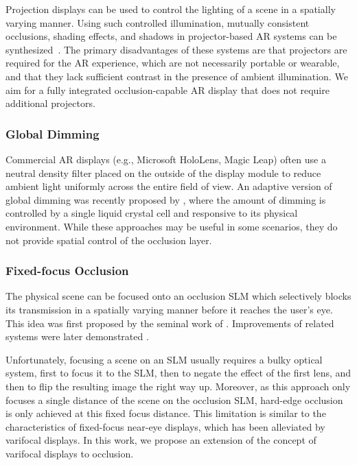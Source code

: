 Projection displays can be used to control the lighting of a scene in a spatially varying manner. Using such controlled illumination, mutually consistent occlusions, shading effects, and shadows in projector-based AR systems can be synthesized~\cite{Bimber:2002,bimber2003consistent,maimone2013general,avveduto2017real}.
The primary disadvantages of these systems are that projectors are required for the AR experience, which are not necessarily portable or wearable, and that they lack sufficient contrast in the presence of ambient illumination.
We aim for a fully integrated occlusion-capable AR display that does not require additional projectors.


\subsubsection{Global Dimming} 

Commercial AR displays (e.g., Microsoft HoloLens, Magic Leap) often use a neutral density filter placed on the outside of the display module to reduce ambient light uniformly across the entire field of view.
An adaptive version of global dimming was recently proposed by \citet{Mori2018}, where the amount of dimming is controlled by a single liquid crystal cell and responsive to its physical environment. While these approaches may be useful in some scenarios, they do not provide spatial control of the occlusion layer.


\subsubsection{Fixed-focus Occlusion} 
\label{sec:varifocal_occlusion:related:fixedfocusOcc}
The physical scene can be focused onto an occlusion SLM which selectively blocks its transmission in a spatially varying manner before it reaches the user's eye. This idea was first proposed by the seminal work of \citet{Kiyokawa2000,Kiyokawa2001,Kiyokawa2003}. Improvements of related systems were later demonstrated \cite{Cakmakci2004, Cakmakci2005, Wilson2017, Howlett2017, Wetzstein2010, Gao2012, Gao2013optical}. 

Unfortunately, focusing a scene on an SLM usually requires a bulky optical system, first to focus it to the SLM, then to negate the effect of the first lens, and then to flip the resulting image the right way up. Moreover, as this approach only focuses a single distance of the scene on the occlusion SLM, hard-edge occlusion is only achieved at this fixed focus distance. This limitation is similar to the characteristics of fixed-focus near-eye displays, which has been alleviated by varifocal displays. In this work, we propose an extension of the concept of varifocal displays to occlusion.

